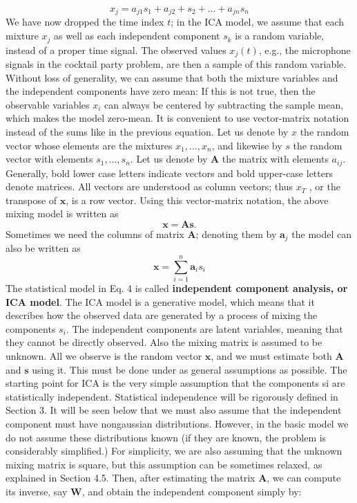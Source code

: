 \documentclass[12pt, a4paper, onecolumn]{IEEEtran}
\begin{document}
\begin{equation}
    x_j = a_{j1}s_1 + a_{j2} + s_2 +...+ a_{jn}s_n
\end{equation}
We have now dropped the time index $t$; in the ICA model, we assume that each mixture $x_j$ as well as each independent component $s_k$ is a random variable, instead of a proper time signal. The observed values $x_j(t)$, e.g., the microphone signals in the cocktail party problem, are then a sample of this random variable. Without loss of generality, we can assume that both the mixture variables and the independent components have zero mean: If this is not true, then the observable variables $x_i$ can always be centered by subtracting the sample mean, which makes the model zero-mean.
It is convenient to use vector-matrix notation instead of the sums like in the previous equation. Let us denote by $x$ the random vector whose elements are the mixtures $x_1,...,x_n$, and likewise by $s$ the random vector with elements $s_1,...,s_n$. Let us denote by $\mathbf{A}$ the matrix with elements $a_{ij}$. Generally, bold lower case letters indicate vectors and bold upper-case letters denote matrices. All vectors are understood as column vectors; thus $x_T$ , or the transpose of $\mathbf{x}$, is a row vector. Using this vector-matrix notation, the above mixing model is written as
\begin{equation}
\mathbf{x}=\mathbf{As}.
\end{equation}
Sometimes we need the columns of matrix $\mathbf{A}$; denoting them by $\mathbf{a}_j$ the model can also be written as
\begin{equation}
\mathbf{x} = \sum_{i=1}^{n}\mathbf{a}_is_i
\end{equation}
The statistical model in Eq. 4 is called \textbf{independent component analysis, or ICA model}. The ICA model is a generative model, which means that it describes how the observed data are generated by a process of mixing the components $s_i$. The independent components are latent variables, meaning that they cannot be directly observed. Also the mixing matrix is assumed to be unknown. All we observe is the random vector $\mathbf{x}$, and we must estimate both $\mathbf{A}$ and $\mathbf{s}$ using it. This must be done under as general assumptions as possible.
The starting point for ICA is the very simple assumption that the components si are statistically independent. Statistical independence will be rigorously defined in Section 3. It will be seen below that we must also assume that the independent component must have nongaussian distributions. However, in the basic model we do not assume these distributions known (if they are known, the problem is considerably simplified.) For simplicity, we are also assuming that the unknown mixing matrix is square, but this assumption can be sometimes relaxed, as explained in Section 4.5. Then, after estimating the matrix $\mathbf{A}$, we can compute its inverse, say $\mathbf{W}$, and obtain the independent component simply by:
\end{document}
